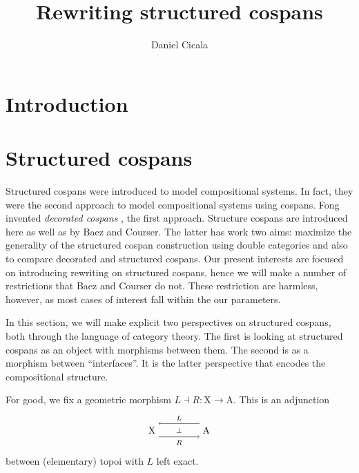 \documentclass{amsart}
\author{Daniel Cicala}
\title{Rewriting structured cospans}
\newcommand{\A}{\cat{A}}
\newcommand{\X}{\cat{X}}
\newcommand{\cat}[1]{\mathrm{#1}}
\newcommand{\from}{\colon}
\theoremstyle{remark}
\theoremstyle{definition}
\begin{document}
\maketitle{}



\section{Introduction}
\label{sec:intro}

\section{Structured cospans}
\label{sec:cat-of-strcsp}

Structured cospans were introduced to model compositional systems. In
fact, they were the second approach to model compositional systems
using cospans.  Fong invented \emph{decorated cospans}
%
%
, the first approach.  Structure cospans are
introduced here as well as by Baez and Courser.
%
%
The latter has work two aims: maximize the
generality of the structured cospan construction using double
categories and also to compare decorated and structured cospans. Our
present interests are focused on introducing rewriting on structured
cospans, hence we will make a number of restrictions that Baez and
Courser do not.  These restriction are harmless, however, as most
cases of interest fall within the our parameters.

In this section, we will make explicit two perspectives on structured
cospans, both through the language of category theory.  The first is
looking at structured cospans as an object with morphisms between
them. The second is as a morphism between ``interfaces''.  It is the
latter perspective that encodes the compositional structure.  


For good, we fix a geometric morphism $ L \dashv R \from \X \to \A
$. This is an adjunction
%
\[
  \begin{tikzpicture}
    \node (1) at (0,0) {\( \X \)};
    \node (2) at (2,0) {\( \A \)};
    \node (3) at (1,0) {\scriptsize{\( \perp \)}};
    \draw [<-] (1.45) to node [above] {\scriptsize{\(  L \)}} (2.135);
    \draw [<-] (2.-135) to node [below] {\scriptsize{ $ R $ } } (1.-45);
  \end{tikzpicture}
\]
%
between (elementary) topoi with $ L $ left exact.
\end{document}
